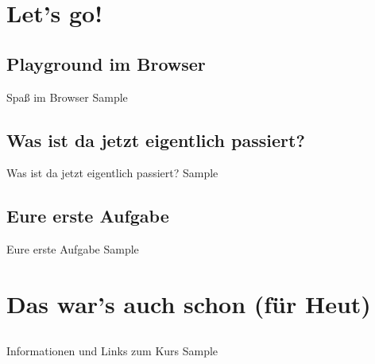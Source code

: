 
\section{Let's go!}


\subsection{Playground im Browser}
\begin{frame}{Spaß im Browser}
	Sample
\end{frame}


\subsection{Was ist da jetzt eigentlich passiert?}
\begin{frame}{Was ist da jetzt eigentlich passiert?}
	Sample
\end{frame}


\subsection{Eure erste Aufgabe}
\begin{frame}{Eure erste Aufgabe}
	Sample
\end{frame}



\section{Das war's auch schon (für Heut)}


\subsection{}
\begin{frame}{Informationen und Links zum Kurs}
	Sample
\end{frame}



